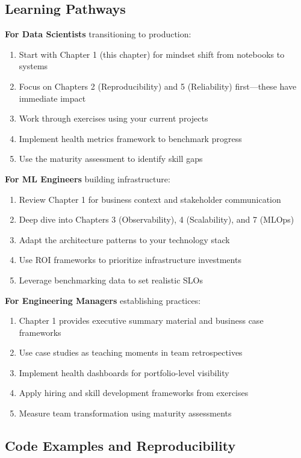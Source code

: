 \subsection{Learning Pathways}

\textbf{For Data Scientists} transitioning to production:
\begin{enumerate}
    \item Start with Chapter 1 (this chapter) for mindset shift from notebooks to systems
    \item Focus on Chapters 2 (Reproducibility) and 5 (Reliability) first---these have immediate impact
    \item Work through exercises using your current projects
    \item Implement health metrics framework to benchmark progress
    \item Use the maturity assessment to identify skill gaps
\end{enumerate}

\textbf{For ML Engineers} building infrastructure:
\begin{enumerate}
    \item Review Chapter 1 for business context and stakeholder communication
    \item Deep dive into Chapters 3 (Observability), 4 (Scalability), and 7 (MLOps)
    \item Adapt the architecture patterns to your technology stack
    \item Use ROI frameworks to prioritize infrastructure investments
    \item Leverage benchmarking data to set realistic SLOs
\end{enumerate}

\textbf{For Engineering Managers} establishing practices:
\begin{enumerate}
    \item Chapter 1 provides executive summary material and business case frameworks
    \item Use case studies as teaching moments in team retrospectives
    \item Implement health dashboards for portfolio-level visibility
    \item Apply hiring and skill development frameworks from exercises
    \item Measure team transformation using maturity assessments
\end{enumerate}

\subsection{Code Examples and Reproducibility}

